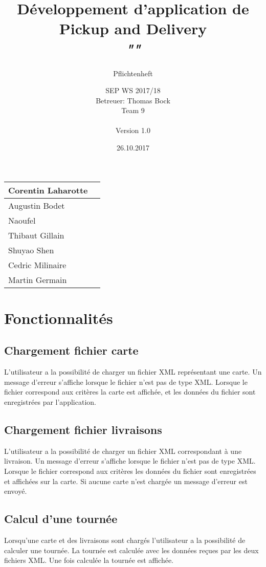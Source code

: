 \documentclass{scrartcl}
\title{Développement d'application de Pickup and Delivery\\
\textit{"\name"}}
\subtitle{Pflichtenheft}
\author{SEP WS 2017/18\\
Betreuer: Thomas Bock\\
Team 9\\ \\
Version 1.0}
\date{26.10.2017}
\begin{document}
\maketitle

\iffalse
\begin{figure}[h]
	\centering
  \texttt{[image: ../img/insta\_logo]}
	\label{fig:logo}
\end{figure}
\fi
\vfill

\begin{center}
  \begin{tabular}{ | l | r | }
    \hline
    Corentin Laharotte \\ \hline
    Augustin Bodet  \\ \hline
    Naoufel \\ \hline
    Thibaut Gillain \\ \hline
    Shuyao Shen \\ \hline
    Cedric Milinaire\\ \hline
    Martin Germain \\ \hline
  \end{tabular}
\end{center}

\thispagestyle{empty}
\pagebreak
\renewcommand{\contentsname}{Table des matières}
\tableofcontents
\newpage

\section{Fonctionnalités}
\subsection{Chargement fichier carte}
L'utilisateur a la possibilité de charger un fichier XML représentant une carte. Un message d'erreur s'affiche lorsque le fichier n'est pas de type XML. Lorsque le fichier correspond aux critères la carte est affichée, et les données du fichier sont enregistrées par l'application. 
\subsection{Chargement fichier livraisons}
L'utilisateur a la possibilité de charger un fichier XML correspondant à une livraison. Un message d'erreur s'affiche lorsque le fichier n'est pas de type XML. Lorsque le fichier correspond aux critères les données du fichier sont enregistrées et affichées sur la carte. Si aucune carte n'est chargée un message d'erreur est envoyé. 
\subsection{Calcul d'une tournée}
Lorsqu'une carte et des livraisons sont chargés l'utilisateur a la possibilité de calculer une tournée. La tournée est calculée avec les données reçues par les deux fichiers XML. Une fois calculée la tournée est affichée. 
\end{document}
